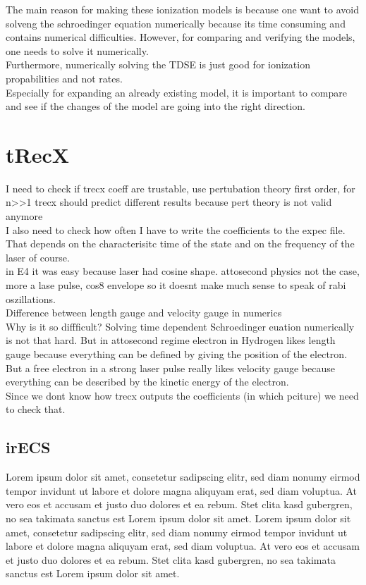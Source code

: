 The main reason for making these ionization models is because one want to avoid solveng the schroedinger equation numerically because its time consuming and contains numerical difficulties.
However, for comparing and verifying the models, one needs to solve it numerically.\\
Furthermore, numerically solving the TDSE is just good for ionization propabilities and not rates.\\
Especially for expanding an already existing model, it is important to compare and see if the changes of the model are going into the right direction.



\section{tRecX}
I need to check if trecx coeff are trustable, use pertubation theory first order, for n>>1 trecx should predict different results because pert theory is not valid anymore\\
I also need to check how often I have to write the coefficients to the expec file. That depends on the characterisitc time of the state and on the frequency of the laser of course.\\
in E4 it was easy because laser had cosine shape. attosecond physics not the case, more a lase pulse, cos8 envelope so it doesnt make much sense to speak of rabi oszillations.\\
Difference between length gauge and velocity gauge in numerics\\
Why is it so diffficult? Solving time dependent Schroedinger euation numerically is not that hard. But in attosecond regime electron in Hydrogen likes length gauge because everything can be defined by giving the position of the electron. 
But a free electron in a strong laser pulse really likes velocity gauge because everything can be described by the kinetic energy of the electron.\\
Since we dont know how trecx outputs the coefficients (in which pciture) we need to check that.
\subsection{irECS}
Lorem ipsum dolor sit amet, consetetur sadipscing elitr, sed diam nonumy eirmod tempor invidunt ut labore et dolore magna aliquyam erat, sed diam voluptua. At vero eos et accusam et justo duo dolores et ea rebum. Stet clita kasd gubergren, no sea takimata sanctus est Lorem ipsum dolor sit amet. Lorem ipsum dolor sit amet, consetetur sadipscing elitr, sed diam nonumy eirmod tempor invidunt ut labore et dolore magna aliquyam erat, sed diam voluptua. At vero eos et accusam et justo duo dolores et ea rebum. Stet clita kasd gubergren, no sea takimata sanctus est Lorem ipsum dolor sit amet.
